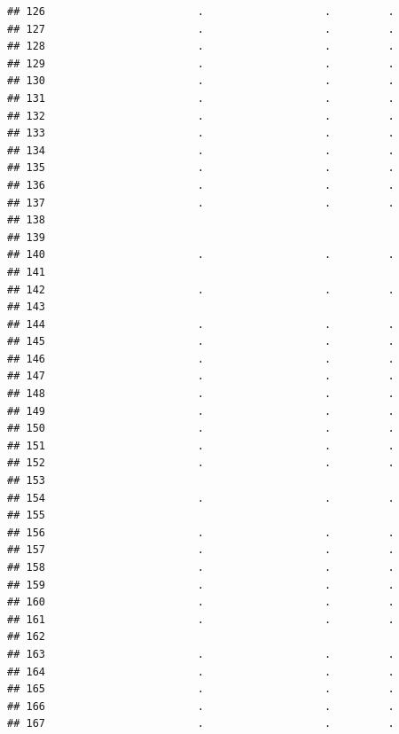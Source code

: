 \documentclass[
]{article}
\begin{document}
\begin{verbatim}
## 126                        .                   .         .
## 127                        .                   .         .
## 128                        .                   .         .
## 129                        .                   .         .
## 130                        .                   .         .
## 131                        .                   .         .
## 132                        .                   .         .
## 133                        .                   .         .
## 134                        .                   .         .
## 135                        .                   .         .
## 136                        .                   .         .
## 137                        .                   .         .
## 138                                                       
## 139                                                       
## 140                        .                   .         .
## 141                                                       
## 142                        .                   .         .
## 143                                                       
## 144                        .                   .         .
## 145                        .                   .         .
## 146                        .                   .         .
## 147                        .                   .         .
## 148                        .                   .         .
## 149                        .                   .         .
## 150                        .                   .         .
## 151                        .                   .         .
## 152                        .                   .         .
## 153                                                       
## 154                        .                   .         .
## 155                                                       
## 156                        .                   .         .
## 157                        .                   .         .
## 158                        .                   .         .
## 159                        .                   .         .
## 160                        .                   .         .
## 161                        .                   .         .
## 162                                                       
## 163                        .                   .         .
## 164                        .                   .         .
## 165                        .                   .         .
## 166                        .                   .         .
## 167                        .                   .         .

\end{verbatim}
\end{document}
